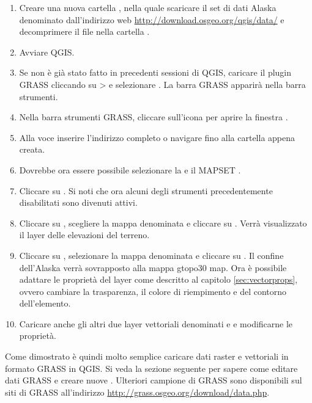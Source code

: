 \begin{enumerate}
  \item Creare una nuova cartella , nella quale scaricare
  il set di dati Alaska denominato 
  dall'indirizzo web \url{http://download.osgeo.org/qgis/data/} e decomprimere
  il file nella cartella .
  \item Avviare QGIS.
  \item Se non è già stato fatto in precedenti sessioni di QGIS, caricare il
  plugin GRASS cliccando su >  e selezionare . La barra GRASS apparirà nella
  barra strumenti.
  \item Nella barra strumenti GRASS, cliccare sull'icona
   per aprire la finestra
  .
  \item Alla voce  inserire l'indirizzo completo o navigare
  fino alla cartella  appena creata.
  \item Dovrebbe ora essere possibile selezionare la  e il MAPSET . 
  \item Cliccare su . Si noti che ora alcuni degli strumenti
  precedentemente disabilitati sono divenuti attivi.
  \item Cliccare su ,
  scegliere la mappa denominata  e cliccare su .
  Verrà visualizzato il layer delle elevazioni del terreno.
  \item Cliccare su ,
  selezionare la mappa denominata  e cliccare su .
  Il confine dell'Alaska verrà sovrapposto alla mappa gtopo30 map. Ora è
  possibile adattare le proprietà del layer come descritto al capitolo
  \ref{sec:vectorprops}, ovvero cambiare la trasparenza, il colore di
  riempimento e del contorno dell'elemento.
  \item Caricare anche gli altri due layer vettoriali denominati
   e  e modificarne le proprietà.
\end{enumerate}

Come dimostrato è quindi molto semplice caricare dati raster e vettoriali in
formato GRASS in QGIS. Si veda la sezione seguente per sapere come editare
dati GRASS e creare nuove . Ulteriori 
campione di GRASS sono disponibili sul siti di GRASS all'indirizzo
\url{http://grass.osgeo.org/download/data.php}.

